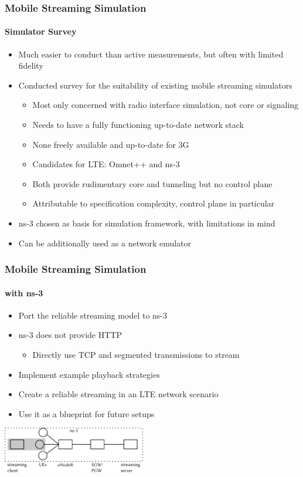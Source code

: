 \documentclass{beamer}
\begin{document}
\begin{frame}
	\frametitle{Mobile Streaming Simulation}
	\framesubtitle{Simulator Survey}

	\begin{itemize}
		\item Much easier to conduct than active measurements, but often with limited fidelity
		\item Conducted survey for the suitability of existing mobile streaming simulators
		\begin{itemize}
			\item Most only concerned with radio interface simulation, not core or signaling
			\item Needs to have a fully functioning up-to-date network stack
			\item None freely available and up-to-date for 3G
			\item Candidates for LTE: Omnet++ and ns-3
			\item Both provide rudimentary core and tunneling but no control plane
			\item Attributable to specification complexity, control plane in particular
		\end{itemize}

		\item ns-3 chosen as basis for simulation framework, with limitations in mind
		\item Can be additionally used as a network emulator
	\end{itemize}
\end{frame}


\begin{frame}
	\frametitle{Mobile Streaming Simulation}
	\framesubtitle{with ns-3}

	\begin{itemize}
		\item Port the reliable streaming model to ns-3
		\item ns-3 does not provide HTTP
			\begin{itemize}
				\item Directly use TCP and segmented transmissions to stream
			\end{itemize}
		\item Implement example playback strategies
		\item Create a reliable streaming in an LTE network scenario
		\item Use it as a blueprint for future setups
	\end{itemize}

	\begin{center}
		\includegraphics[height=2cm]{../../chapters/06-mobilestreamingmeasurements/images/streaming-simulation.pdf}
	\end{center}

\end{frame}
\end{document}
